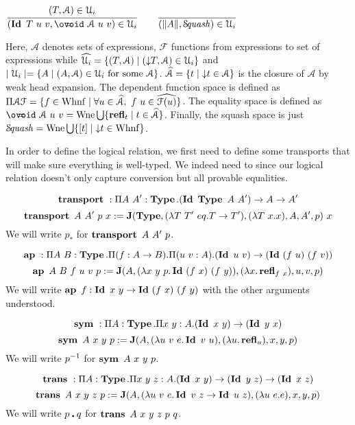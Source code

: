 \documentclass[a4paper,english]{lipics-utf8x}
\begin{document}
  \begin{center}
  \(
    \ru{(T,\mathcal{A}) \in \U_i
      }{(\Id T\ u\ v, \oeq\ \mathcal{A}\ u\ v) \in \U_i}
    \qquad
    \ru{}{(\squash{A}, \Squash) \in \U_i}
  \)
  \end{center}

  \noindent %
  Here, $\mathcal{A}$ denotes sets of expressions, $\mathcal{F}$ functions from
  expressions to set of expressions while
  $\widehat{\mathcal{U}_i} = \{ (T,\mathcal{A}) \mid ({\downarrow} T, \mathcal{A}) \in \mathcal{U}_i \}$
  and $\mid \mathcal{U}_i \mid = \{ A \mid (A, \mathcal{A}) \in \mathcal{U}_i \text{ for some }
  \mathcal{A} \}$.
  $\widehat{\mathcal{A}} = \{ t \mid {\downarrow} t \in \mathcal{A} \}$ is the closure
  of $\mathcal{A}$ by weak head expansion.
  The dependent function space is defined as
  $\Pi \mathcal{A} \mathcal{F} = \{ f \in \operatorname{Whnf} \mid \forall u \in
  \widehat{\mathcal{A}},\ f~u \in \widehat{\mathcal{F}(u)} \}$.
  The equality space is defined as
  $\oeq\ \mathcal{A}\ u\ v = \Wne \bigcup \{ \refl_t \mid t \in
  \widehat{\mathcal{A}} \}$.
  Finally, the squash space is just
  $\operatorname{\mathcal{S}\!\mathit{quash}} = \operatorname{Wne} \bigcup \{ [t] \mid {\downarrow} t \in \operatorname{Whnf} \}$.


  In order to define the logical relation, we first need to define some
  transports that will make sure everything is well-typed. We indeed need to
  since our logical relation doesn't only capture conversion but all provable
  equalities.

  \[\operatorname{\mathbf{transport}~} : \Pi A\ A' : \operatorname{\mathbf{Type}}.(\operatorname{\mathbf{Id}~} \operatorname{\mathbf{Type}}\ A\ A') \to A \to A'\]
  \[\transport A\ A'\ p\ x := \J(\Type, (\lambda T\ T'\ eq. T \to T'),
  (\lambda T\ x. x), A, A', p)\ x\]
  We will write $p_*$ for $\operatorname{\mathbf{transport}~} A\ A'\ p$.

  \[\operatorname{\mathbf{ap}~} : \Pi A\ B : \operatorname{\mathbf{Type}}. \Pi (f : A \to B). \Pi (u\ v : A).
    (\operatorname{\mathbf{Id}~} u\ v) \to (\operatorname{\mathbf{Id}~} (f\ u)\ (f\ v))\]
  \[\operatorname{\mathbf{ap}~} A\ B\ f\ u\ v\ p := \operatorname{\mathbf{J}}(A, (\lambda x\ y\ p. \operatorname{\mathbf{Id}~} (f\ x)\ (f\ y)),
  (\lambda x. \operatorname{\mathbf{refl}}_{f\ x}), u, v, p)\]
  We will write $\operatorname{\mathbf{ap}~} f : \operatorname{\mathbf{Id}~} x\ y \to \operatorname{\mathbf{Id}~} (f\ x)\ (f\ y)$ with the other
  arguments understood.

  \[\operatorname{\mathbf{sym}~} : \Pi A : \operatorname{\mathbf{Type}}. \Pi x\ y : A. (\operatorname{\mathbf{Id}~} x\ y) \to (\operatorname{\mathbf{Id}~} y\ x)\]
  \[\sym A\ x\ y\ p := \J(A, (\lambda u\ v\ e. \Id v\ u), (\lambda u. \refl_u),
  x,y,p)\]
  We will write $p^{-1}$ for $\operatorname{\mathbf{sym}~} A\ x\ y\ p$.

  \[\operatorname{\mathbf{trans}~} : \Pi A : \operatorname{\mathbf{Type}}. \Pi x\ y\ z : A.
  (\operatorname{\mathbf{Id}~} x\ y) \to (\operatorname{\mathbf{Id}~} y\ z) \to (\operatorname{\mathbf{Id}~} x\ z)\]
  \[
    \operatorname{\mathbf{trans}~} A\ x\ y\ z\ p := \operatorname{\mathbf{J}}(A, (\lambda u\ v\ e. \operatorname{\mathbf{Id}~} v\ z \to \operatorname{\mathbf{Id}~} u\ z),
    (\lambda u\ e. e), x, y, p)
  \]
  We will write $p \centerdot q$ for $\operatorname{\mathbf{trans}~} A\ x\ y\ z\ p\ q$.
\end{document}
